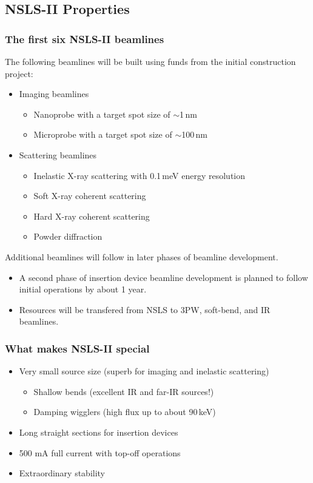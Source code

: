 \documentclass[10pt, xcolor=x11names, compress]{beamer}
\begin{document}
\subsection[NSLS-II Properties]{NSLS-II Properties}

\begin{frame}
  \frametitle{The first six NSLS-II beamlines}
  The following beamlines will be built using funds from the initial
  construction project:
  \begin{itemize}
    \item Imaging beamlines
    \begin{itemize}
    \item Nanoprobe with a target spot size of $\sim$1\,nm
    \item Microprobe with a target spot size of $\sim$100\,nm
    \end{itemize}
  \item Scattering beamlines
    \begin{itemize}
    \item Inelastic X-ray scattering with 0.1\,meV energy resolution
    \item Soft X-ray coherent scattering
    \item Hard X-ray coherent scattering
    \item Powder diffraction
    \end{itemize}
  \end{itemize}

  \bigskip

  Additional beamlines will follow in later phases of beamline
  development.  
  \begin{itemize}
  \item A second phase of insertion device beamline development is
    planned to follow initial operations by about 1 year.
  \item Resources will be transfered from NSLS to 3PW, soft-bend, and
    IR beamlines.
  \end{itemize}

\end{frame}

\begin{frame}
  \frametitle{What makes NSLS-II special}
  \begin{itemize}
  \item Very small source size (superb for imaging and inelastic scattering)
    \begin{itemize}
    \item Shallow bends (excellent IR and far-IR sources!)
    \item Damping wigglers (high flux up to about 90\,keV)
    \end{itemize}
  \item Long straight sections for insertion devices
  \item 500 mA full current with top-off operations
  \item Extraordinary stability
  \end{itemize}
\end{frame}
\end{document}
